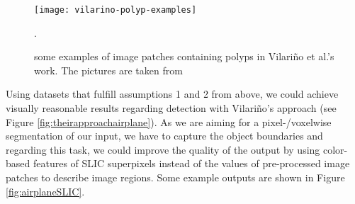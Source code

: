 \begin{figure}[ht]
	\centering
	\texttt{[image: vilarino-polyp-examples]}
	\caption{some examples of image patches containing polyps in Vilari\~no et al.'s work. The pictures are taken from \cite{vilarino2007automatic}}.
	\label{fig:vilarinoPolypExamples}
\end{figure}

Using datasets that fulfill assumptions 1 and 2 from above, we could achieve visually reasonable results regarding detection with Vilari\~no's approach (see Figure \ref{fig:theirapproachairplane}). 
As we are aiming for a pixel-/voxelwise segmentation of our input, we have to capture the object boundaries and regarding this task, we could improve the quality of the output by using color-based features of SLIC superpixels instead of the values of pre-processed image patches to describe image regions. 
Some example outputs are shown in Figure \ref{fig:airplaneSLIC}. 

